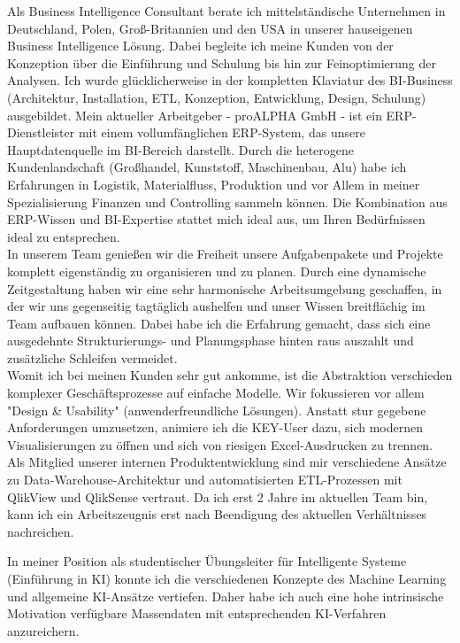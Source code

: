 \par
Als Business Intelligence Consultant berate ich mittelst\"andische Unternehmen in Deutschland, Polen, Groß-Britannien und den USA in unserer hauseigenen Business Intelligence Lösung. Dabei begleite ich meine Kunden von der Konzeption über die Einführung und Schulung bis hin zur Feinoptimierung der Analysen. Ich wurde glücklicherweise in der kompletten Klaviatur des BI-Business (Architektur, Installation, ETL, Konzeption, Entwicklung, Design, Schulung) ausgebildet. Mein aktueller Arbeitgeber - proALPHA GmbH - ist ein ERP-Dienstleister mit einem vollumfänglichen ERP-System, das unsere Hauptdatenquelle im BI-Bereich darstellt. Durch die heterogene Kundenlandschaft (Großhandel, Kunststoff, Maschinenbau, Alu) habe ich Erfahrungen in Logistik, Materialfluss, Produktion und vor Allem in meiner Spezialisierung Finanzen und Controlling sammeln können. Die Kombination aus ERP-Wissen und BI-Expertise stattet mich ideal aus, um Ihren Bedürfnissen ideal zu entsprechen.\\
In unserem Team genie\ss en wir die Freiheit unsere Aufgabenpakete und Projekte komplett eigenst\"andig zu organisieren und zu planen. Durch eine dynamische Zeitgestaltung haben wir eine sehr harmonische Arbeitsumgebung geschaffen, in der wir uns gegenseitig tagt\"aglich aushelfen und unser Wissen breitflächig im Team aufbauen können. Dabei habe ich die Erfahrung gemacht, dass sich eine ausgedehnte Strukturierungs- und Planungsphase hinten raus auszahlt und zus\"atzliche Schleifen vermeidet.\\
Womit ich bei meinen Kunden sehr gut ankomme, ist die Abstraktion verschieden komplexer Gesch\"aftsprozesse auf einfache Modelle. Wir fokussieren vor allem "Design \& Usability" (anwenderfreundliche L\"osungen). Anstatt stur gegebene Anforderungen umzusetzen, animiere ich die KEY-User dazu, sich modernen Visualisierungen zu öffnen und sich von riesigen Excel-Ausdrucken zu trennen. 
Als Mitglied unserer internen Produktentwicklung sind mir verschiedene Ansätze zu Data-Warehouse-Architektur und automatisierten ETL-Prozessen mit QlikView und QlikSense vertraut.
Da ich erst 2 Jahre im aktuellen Team bin, kann ich ein Arbeitszeugnis erst nach Beendigung des aktuellen Verhältnisses nachreichen.

In meiner Position als studentischer \"Ubungsleiter für Intelligente Systeme (Einführung in KI) konnte ich die verschiedenen Konzepte des Machine Learning und allgemeine KI-Ansätze vertiefen. Daher habe ich auch eine hohe intrinsische Motivation verfügbare Massendaten mit entsprechenden KI-Verfahren anzureichern.

